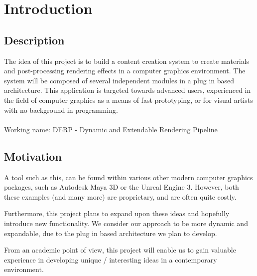 
\chapter{Introduction}
 
 \section{Description}
The idea of this project is to build a content creation system to create materials and post-processing rendering effects in a computer graphics environment. The system will be composed of several independent modules in a plug in based architecture. 
This application is targeted towards advanced users, experienced in the field of computer graphics as a means of fast prototyping, or for visual artists with no background in programming. 
\\
\\
Working name: DERP - Dynamic and Extendable Rendering Pipeline

\section{Motivation}
A tool such as this, can be found within various other modern computer graphics packages, such as Autodesk Maya 3D or the Unreal Engine 3. However, both these examples (and many more) are proprietary, and are often quite costly. 
 
Furthermore, this project plans to expand upon these ideas and hopefully introduce new functionality. We consider our approach to be more dynamic and expandable, due to the plug in based architecture we plan to develop. 
 
From an academic point of view, this project will enable us to gain valuable experience in developing unique / interesting ideas in a contemporary environment. 
 
